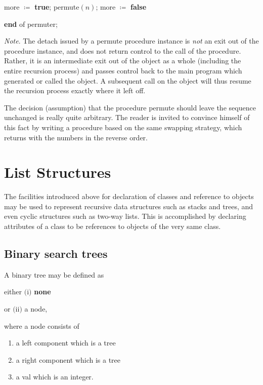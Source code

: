 \documentclass[twoside,11pt]{book}
\begin{document}
\quad \quad \quad more $\coloneq$ \textbf{true}; permute$(n)$; more $\coloneq$ \textbf{false}

\quad \textbf{end} of permuter;

\textit{Note}. The detach issued by a permute procedure instance is \textit{not} an exit out of the procedure instance, and does not return control to the call of the procedure. Rather, it is an intermediate exit out of the object as a whole (including the entire recursion process) and passes control back to the main program which generated or called the object. A subsequent call on the object will thus resume the recursion process exactly where it left off.

The decision (assumption) that the procedure permute should leave the sequence unchanged is really quite arbitrary. The reader is invited to convince himself of this fact by writing a procedure based on the same swapping strategy, which returns with the numbers in the reverse order.

\section[List structures]{List Structures}

The facilities introduced above for declaration of classes and reference to
objects may be used to represent recursive data structures such as stacks and
trees, and even cyclic structures such as two-way lists. This is accomplished
by declaring attributes of a class to be references to objects of the very same
class.

\subsection{Binary search trees}

A binary tree may be defined as

\quad either \tabto*{5.35em}$($i$)$ \tabto*{7.35em}\textbf{none}

\tabto*{4em}or $($ii$)$ a node,

\noindent
where a node consists of

\begin{enumerate}[wide, nosep, label=(\alph*)]
	\item a left component which is a tree
	\item a right component which is a tree
	\item a val which is an integer.
\end{enumerate}
\end{document}
